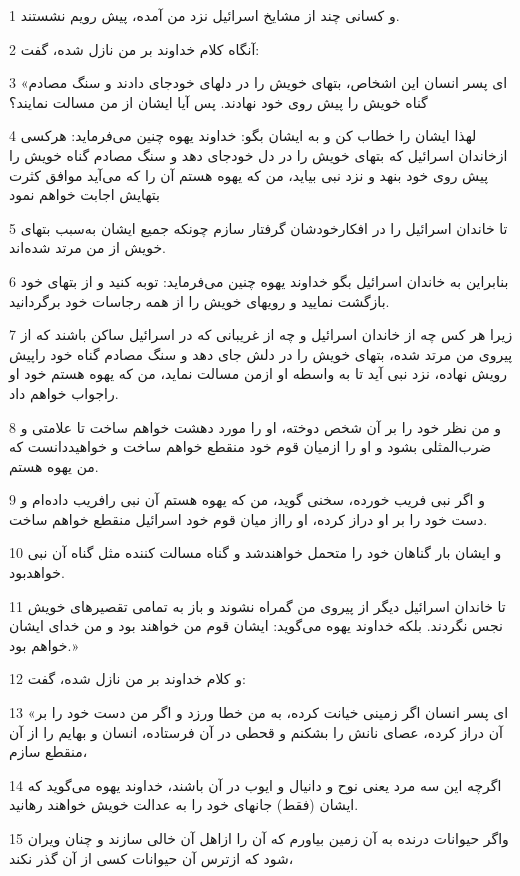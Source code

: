 \par 1 و کسانی چند از مشایخ اسرائیل نزد من آمده، پیش رویم نشستند.
\par 2 آنگاه کلام خداوند بر من نازل شده، گفت:
\par 3 «ای پسر انسان این اشخاص، بتهای خویش را در دلهای خودجای دادند و سنگ مصادم گناه خویش را پیش روی خود نهادند. پس آیا ایشان از من مسالت نمایند؟
\par 4 لهذا ایشان را خطاب کن و به ایشان بگو: خداوند یهوه چنین می‌فرماید: هرکسی ازخاندان اسرائیل که بتهای خویش را در دل خودجای دهد و سنگ مصادم گناه خویش را پیش روی خود بنهد و نزد نبی بیاید، من که یهوه هستم آن را که می‌آید موافق کثرت بتهایش اجابت خواهم نمود
\par 5 تا خاندان اسرائیل را در افکارخودشان گرفتار سازم چونکه جمیع ایشان به‌سبب بتهای خویش از من مرتد شده‌اند.
\par 6 بنابراین به خاندان اسرائیل بگو خداوند یهوه چنین می‌فرماید: توبه کنید و از بتهای خود بازگشت نمایید و رویهای خویش را از همه رجاسات خود برگردانید.
\par 7 زیرا هر کس چه از خاندان اسرائیل و چه از غریبانی که در اسرائیل ساکن باشند که از پیروی من مرتد شده، بتهای خویش را در دلش جای دهد و سنگ مصادم گناه خود راپیش رویش نهاده، نزد نبی آید تا به واسطه او ازمن مسالت نماید، من که یهوه هستم خود او راجواب خواهم داد.
\par 8 و من نظر خود را بر آن شخص دوخته، او را مورد دهشت خواهم ساخت تا علامتی و ضرب‌المثلی بشود و او را ازمیان قوم خود منقطع خواهم ساخت و خواهیددانست که من یهوه هستم.
\par 9 و اگر نبی فریب خورده، سخنی گوید، من که یهوه هستم آن نبی رافریب داده‌ام و دست خود را بر او دراز کرده، او رااز میان قوم خود اسرائیل منقطع خواهم ساخت.
\par 10 و ایشان بار گناهان خود را متحمل خواهندشد و گناه مسالت کننده مثل گناه آن نبی خواهدبود.
\par 11 تا خاندان اسرائیل دیگر از پیروی من گمراه نشوند و باز به تمامی تقصیرهای خویش نجس نگردند. بلکه خداوند یهوه می‌گوید: ایشان قوم من خواهند بود و من خدای ایشان خواهم بود.»
\par 12 و کلام خداوند بر من نازل شده، گفت:
\par 13 «ای پسر انسان اگر زمینی خیانت کرده، به من خطا ورزد و اگر من دست خود را بر آن دراز کرده، عصای نانش را بشکنم و قحطی در آن فرستاده، انسان و بهایم را از آن منقطع سازم،
\par 14 اگر‌چه این سه مرد یعنی نوح و دانیال و ایوب در آن باشند، خداوند یهوه می‌گوید که ایشان (فقط) جانهای خود را به عدالت خویش خواهند رهانید.
\par 15 واگر حیوانات درنده به آن زمین بیاورم که آن را ازاهل آن خالی سازند و چنان ویران شود که ازترس آن حیوانات کسی از آن گذر نکند،
